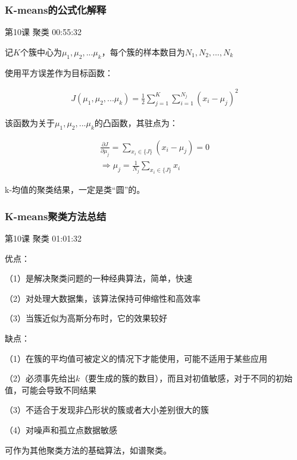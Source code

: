 \documentclass[UTF8]{ctexbook}
\begin{document}
\subsubsection{K-means的公式化解释}

第10课 聚类 00:55:32

记$K$个簇中心为$\mu_{1},\mu_{2},...\mu_{k}$，每个簇的样本数目为$N_{1},N_{2},...,N_{k}$

使用平方误差作为目标函数：

\begin{equation}
\begin{aligned}
J(\mu_{1},\mu_{2},...\mu_{k}) = \frac{1}{2} \sum_{j=1}^{K} \sum_{i=1}^{N_{j}} (x_{i}-\mu_{j})^{2}
\end{aligned}
\end{equation}

该函数为关于$\mu_{1},\mu_{2},...\mu_{k}$的凸函数，其驻点为：

\begin{equation}
\begin{aligned}
\frac{\partial J}{\partial \mu_{j}} = \sum_{x_{i} \in \{J\} }^{ }(x_{i}-\mu_{j}) = 0 \\
\Rightarrow \mu_{j}=\frac{1}{N_{j}} \sum_{x_{i} \in \{J\}}^{ }x_{i}
\end{aligned}
\end{equation}

k-均值的聚类结果，一定是类“圆”的。

\subsubsection{K-means聚类方法总结}

第10课 聚类 01:01:32

优点：

（1）是解决聚类问题的一种经典算法，简单，快速

（2）对处理大数据集，该算法保持可伸缩性和高效率

（3）当簇近似为高斯分布时，它的效果较好

缺点：

（1）在簇的平均值可被定义的情况下才能使用，可能不适用于某些应用

（2）必须事先给出$k$（要生成的簇的数目），而且对初值敏感，对于不同的初始值，可能会导致不同结果

（3）不适合于发现非凸形状的簇或者大小差别很大的簇

（4）对噪声和孤立点数据敏感

可作为其他聚类方法的基础算法，如谱聚类。
\end{document}
